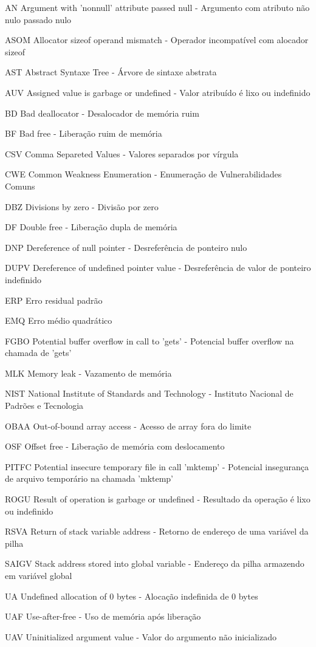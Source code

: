 \begin{siglas}
  \item[AN] Argument with 'nonnull' attribute passed null - Argumento com atributo não nulo passado nulo
  \item[ASOM] Allocator sizeof operand mismatch - Operador incompatível com alocador sizeof
  \item[AST] Abstract Syntaxe Tree - Árvore de sintaxe abstrata
  \item[AUV] Assigned value is garbage or undefined - Valor atribuído é lixo ou indefinido
  \item[BD] Bad deallocator - Desalocador de memória ruim
  \item[BF] Bad free - Liberação ruim de memória
  \item[CSV] Comma Separeted Values - Valores separados por vírgula
  \item[CWE] Common Weakness Enumeration - Enumeração de Vulnerabilidades Comuns
  \item[DBZ] Divisions by zero - Divisão por zero
  \item[DF] Double free - Liberação dupla de memória
  \item[DNP] Dereference of null pointer - Desreferência de ponteiro nulo
  \item[DUPV] Dereference of undefined pointer value - Desreferência de valor de ponteiro indefinido
  \item[ERP] Erro residual padrão
  \item[EMQ] Erro médio quadrático
  \item[FGBO] Potential buffer overflow in call to 'gets' - Potencial buffer overflow na chamada de 'gets'
  \item[MLK] Memory leak - Vazamento de memória
  \item[NIST] National Institute of Standards and Technology - Instituto
    Nacional de Padrões e Tecnologia
  \item[OBAA] Out-of-bound array access - Acesso de array fora do limite
  \item[OSF] Offset free - Liberação de memória com deslocamento
  \item[PITFC] Potential insecure temporary file in call 'mktemp' - Potencial insegurança de arquivo temporário na chamada 'mktemp'
  \item[ROGU] Result of operation is garbage or undefined - Resultado da operação é lixo ou indefinido
  \item[RSVA] Return of stack variable address - Retorno de endereço de uma variável da pilha
  \item[SAIGV] Stack address stored into global variable - Endereço da pilha armazendo em variável global
  \item[UA] Undefined allocation of 0 bytes - Alocação indefinida de 0 bytes
  \item[UAF] Use-after-free - Uso de memória após liberação
  \item[UAV] Uninitialized argument value - Valor do argumento não inicializado
\end{siglas}
